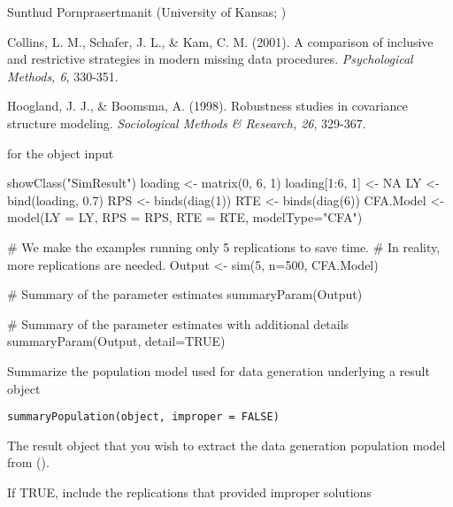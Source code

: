 \documentclass[a4paper]{book}
\begin{document}
%
\begin{Author}\relax
Sunthud Pornprasertmanit (University of Kansas; )
\end{Author}
%
\begin{References}\relax
Collins, L. M., Schafer, J. L., \& Kam, C. M. (2001). A comparison of inclusive and restrictive strategies in modern missing data procedures. \emph{Psychological Methods, 6}, 330-351.

Hoogland, J. J., \& Boomsma, A. (1998). Robustness studies in covariance structure modeling. \emph{Sociological Methods \& Research, 26}, 329-367.
\end{References}
%
\begin{SeeAlso}\relax
{} for the object input
\end{SeeAlso}
%
\begin{Examples}
\begin{ExampleCode}
showClass("SimResult")
loading <- matrix(0, 6, 1)
loading[1:6, 1] <- NA
LY <- bind(loading, 0.7)
RPS <- binds(diag(1))
RTE <- binds(diag(6))
CFA.Model <- model(LY = LY, RPS = RPS, RTE = RTE, modelType="CFA")

# We make the examples running only 5 replications to save time.
# In reality, more replications are needed.
Output <- sim(5, n=500, CFA.Model)

# Summary of the parameter estimates
summaryParam(Output)

# Summary of the parameter estimates with additional details
summaryParam(Output, detail=TRUE)
\end{ExampleCode}
\end{Examples}
%
\begin{Description}\relax
Summarize the population model used for data generation underlying a result object
\end{Description}
%
\begin{Usage}
\begin{verbatim}
summaryPopulation(object, improper = FALSE)
\end{verbatim}
\end{Usage}
%
\begin{Arguments}
\begin{ldescription}
\item[\code{object}] 
The result object that you wish to extract the data generation population model from ().

\item[\code{improper}] 
If TRUE, include the replications that provided improper solutions

\end{ldescription}
\end{Arguments}
\end{document}
